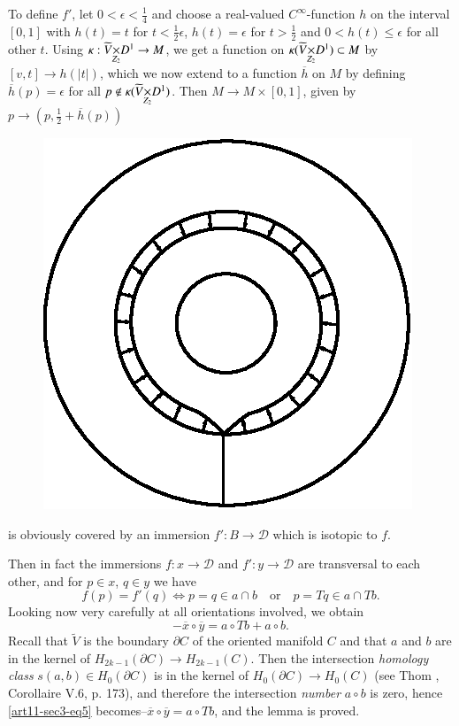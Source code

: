 To define $f'$, let $0<\epsilon <\frac{1}{4}$ and choose a real-valued $C^{\infty}$-function $h$ on the interval $[0,1]$ with $h(t)=t$ for $t<\frac{1}{2}\epsilon$, $h(t)=\epsilon$ for $t>\frac{1}{2}$ and $0<h(t)\leq \epsilon$ for all other $t$. Using $\kappa : \fprod{\widetilde{V}}{D^{1}}{Z_{2}}\to M$, we get a function on $\kappa (\fprod{\widetilde{V}}{D^{1}}{Z_{2}})\subset M$ by $[v,t]\to h(|t|)$, which we now extend to a function $\overline{h}$ on $M$ by defining $\overline{h}(p)=\epsilon$ for all $p\not\in \kappa (\fprod{\widetilde{V}}{D^{1}}{Z_{2}})$. Then $M\to M\times [0,1]$, given by $p\to (p,\frac{1}{2}+\overline{h}(p))$
\begin{figure}[H]
\centering
\includegraphics{figures/fig8.eps}
\end{figure}
is obviously covered by an immersion $f':B\to \mathscr{D}$ which is isotopic to $f$.

Then in fact the immersions $f:x\to \mathscr{D}$ and $f':y\to \mathscr{D}$ are transversal to each other, and for $p\in x$, $q\in y$ we have
$$
f(p)=f'(q)\Leftrightarrow p=q\in a\cap b\text{~~ or~~ } p=Tq\in a\cap Tb.
$$
Looking now very carefully at all orientations involved, we obtain 
\begin{equation}
-\overline{x}\circ \overline{y}=a\circ Tb+a\circ b.\label{art11-sec3-eq5}
\end{equation}
Recall that $\widetilde{V}$ is the boundary $\partial C$ of the oriented manifold $C$ and that $a$ and $b$ are in the kernel of $H_{2k-1}(\partial C)\to H_{2k-1}(C)$. Then the intersection {\em homology class} $s(a,b)\in H_{0}(\partial C)$ is in the kernel of $H_{0}(\partial C)\to H_{0}(C)$ (see Thom \cite{art11-key8}, Corollaire V.6, p. 173), and therefore the intersection {\em number} $a\circ b$ is zero, hence \eqref{art11-sec3-eq5} becomes--$\overline{x}\circ \overline{y}=a\circ Tb$, and the lemma is proved.

